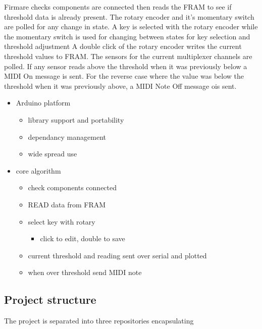 Firmare checks components are connected then reads the FRAM to see if
threshold data is already present. The rotary encoder and it's momentary
switch are polled for any change in state. A key is selected with the
rotary encoder while the momentary switch is used for changing between
states for key selection and threshold adjustment A double click of the
rotary encoder writes the current threshold values to FRAM. The sensors
for the current multiplexer channels are polled. If any sensor reads
above the threshold when it was previously below a MIDI On message is
sent. For the reverse case where the value was below the threshold when
it was previously above, a MIDI Note Off message ois sent.

\begin{itemize}
\tightlist
\item
  Arduino platform

  \begin{itemize}
  \tightlist
  \item
    library support and portability
  \item
    dependancy management
  \item
    wide spread use
  \end{itemize}
\item
  core algorithm

  \begin{itemize}
  \tightlist
  \item
    check components connected
  \item
    READ data from FRAM
  \item
    select key with rotary

    \begin{itemize}
    \tightlist
    \item
      click to edit, double to save
    \end{itemize}
  \item
    current threshold and reading sent over serial and plotted
  \item
    when over threshold send MIDI note
  \end{itemize}
\end{itemize}

\subsection{Project structure}\label{project-structure}

The project is separated into three repositories encapsulating

